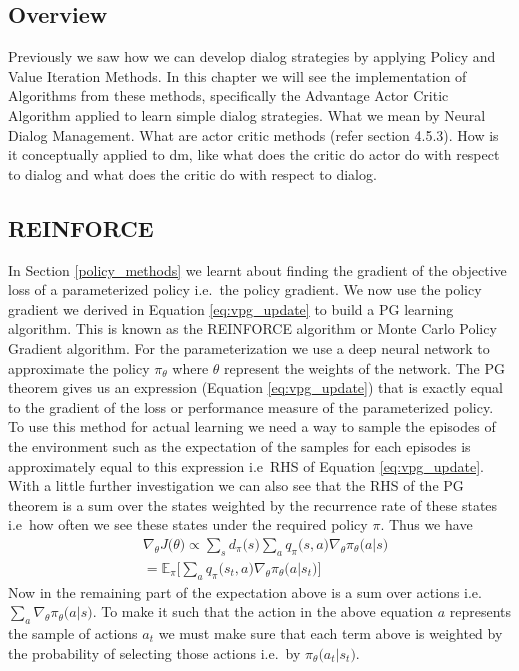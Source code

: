 \documentclass[14pt]{extarticle}
\numberwithin{equation}{section}
\begin{document}
	\subsection{Overview}
	Previously we saw how we can develop dialog strategies by applying Policy and Value Iteration Methods. In this chapter we will see the implementation of Algorithms from these methods, specifically the Advantage Actor Critic Algorithm applied to learn simple dialog strategies.	What we mean by Neural Dialog Management. What are actor critic methods (refer section 4.5.3). How is it conceptually applied to dm, like what does the critic do actor do with respect to dialog and what does the critic do with respect to dialog.
		\subsection{REINFORCE}
	In Section \ref{policy_methods} we learnt about finding the gradient of the objective loss of a parameterized policy i.e.\ the policy gradient. We now use the policy gradient we derived in Equation \ref{eq:vpg_update} to build a PG learning algorithm. This is known as the REINFORCE algorithm or Monte Carlo Policy Gradient algorithm\cite{Williams92REINFORCE}. For the parameterization we use a deep neural network to approximate the policy $\pi_{\theta}$ where $\theta$ represent the weights of the network. The PG theorem gives us an expression (Equation \ref{eq:vpg_update}) that is exactly equal to the gradient of the loss or performance measure of the parameterized policy. To use this method for actual learning we need a way to sample the episodes of the environment such as the expectation of the samples for each episodes is approximately equal to this expression i.e\ RHS of Equation \ref{eq:vpg_update}. With a little further investigation we can also see that the RHS of the PG theorem is a sum over the states weighted by the recurrence rate of these states i.e\ how often we see these states under the required policy $\pi$. Thus we have 
	\begin{align}
	&\nabla_{\theta}J\big(\theta\big)\propto \sum_{s}d_{\pi}\big(s\big)\sum_{a}q_{\pi}\big(s,a\big)\nabla_{\theta} \pi_{\theta}\big(a|s\big)\nonumber\\
	& = \mathbb{E}_{\pi}\big[\sum_{a}q_{\pi}\big(s_t,a\big)\nabla_{\theta}\pi_{\theta}\big(a|s_t\big)\big]\label{eq:pg-expectation}
	\end{align}
	Now in the remaining part of the expectation above is a sum over actions i.e.\ $\sum_{a}\nabla_{\theta}\pi_{\theta}\big(a|s\big)$. To make it such that the action in the above equation $a$ represents the sample of actions $a_t$ we must make sure that each term above is weighted by the probability of selecting those actions i.e.\ by $\pi_{\theta}\big(a_t|s_t\big)$.
\end{document}
